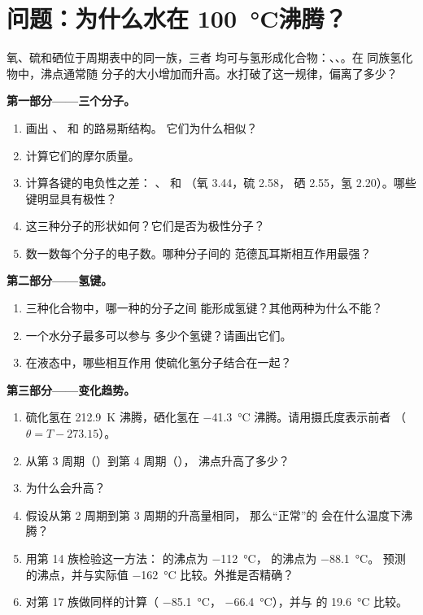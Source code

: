 \section{问题：为什么水在 \texorpdfstring{\qty{100}{\celsius}}{100 摄氏度}沸腾？}

\begin{problem}
\label{pb:g11:polarity-and-cohesion:1}
氧、硫和硒位于周期表中的同一族，三者
均可与氢形成化合物：、、。在
同族氢化物中，沸点通常随
分子的大小增加而升高。水打破了这一规律，偏离了多少？

\medskip
\noindent\textbf{第一部分——三个分子。}
\begin{enumerate}
  \item 画出 、 和  的路易斯结构。
        它们为什么相似？
  \item 计算它们的摩尔质量。
  \item 计算各键的电负性之差：
        、 和 （氧 3.44，硫 2.58，
        硒 2.55，氢 2.20）。哪些键明显具有极性？
  \item 这三种分子的形状如何？它们是否为极性分子？
  \item 数一数每个分子的电子数。哪种分子间的
        范德瓦耳斯相互作用最强？
\end{enumerate}

\medskip
\noindent\textbf{第二部分——氢键。}
\begin{enumerate}[resume]
  \item 三种化合物中，哪一种的分子之间
        能形成氢键？其他两种为什么不能？
  \item 一个水分子最多可以参与
        多少个氢键？请画出它们。
  \item 在液态中，哪些相互作用
        使硫化氢分子结合在一起？
\end{enumerate}

\medskip
\noindent\textbf{第三部分——变化趋势。}
\begin{enumerate}[resume]
  \item 硫化氢在 \qty{212.9}{K} 沸腾，硒化氢在
        \qty{-41.3}{\celsius} 沸腾。请用摄氏度表示前者
        （$\theta = T - 273.15$）。
  \item 从第 3 周期（）到第 4 周期（），
        沸点升高了多少？
  \item 为什么会升高？
  \item 假设从第 2 周期到第 3 周期的升高量相同，
        那么“正常”的  会在什么温度下沸腾？
  \item 用第 14 族检验这一方法： 的沸点为
        \qty{-112}{\celsius}， 的沸点为 \qty{-88.1}{\celsius}。
        预测  的沸点，并与实际值
        \qty{-162}{\celsius} 比较。外推是否精确？
  \item 对第 17 族做同样的计算（ \qty{-85.1}{\celsius}，
         \qty{-66.4}{\celsius}），并与  的
        \qty{19.6}{\celsius} 比较。
\end{enumerate}


\end{problem}
